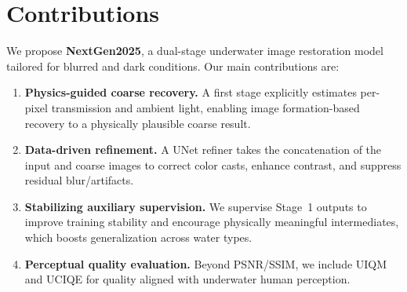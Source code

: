 \section{Contributions}
We propose \textbf{NextGen2025}, a dual-stage underwater image restoration model tailored for blurred and dark conditions. Our main contributions are:
\begin{enumerate}
  \item \textbf{Physics-guided coarse recovery.} A first stage explicitly estimates per-pixel transmission and ambient light, enabling image formation-based recovery to a physically plausible coarse result.
  \item \textbf{Data-driven refinement.} A UNet refiner takes the concatenation of the input and coarse images to correct color casts, enhance contrast, and suppress residual blur/artifacts.
  \item \textbf{Stabilizing auxiliary supervision.} We supervise Stage~1 outputs to improve training stability and encourage physically meaningful intermediates, which boosts generalization across water types.
  \item \textbf{Perceptual quality evaluation.} Beyond PSNR/SSIM, we include UIQM and UCIQE for quality aligned with underwater human perception.
\end{enumerate}
